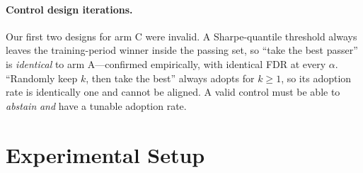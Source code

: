 \documentclass[11pt]{article}
\begin{document}
\paragraph{Control design iterations.} Our first two designs for arm C were invalid. A
Sharpe-quantile threshold always leaves the training-period winner inside the passing set, so
``take the best passer'' is \emph{identical} to arm A---confirmed empirically, with identical
FDR at every $\alpha$. ``Randomly keep $k$, then take the best'' always adopts for $k\ge1$, so
its adoption rate is identically one and cannot be aligned. A valid control must be able to
\emph{abstain} \emph{and} have a tunable adoption rate.

\section{Experimental Setup}
\label{sec:setup}
\end{document}
